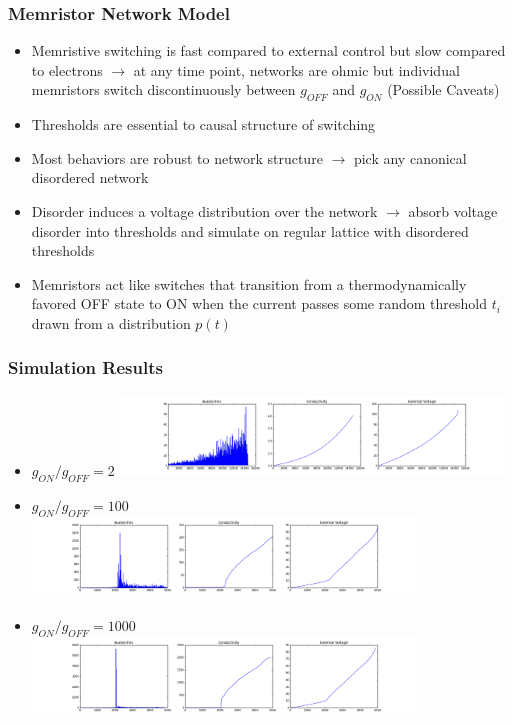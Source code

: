 \documentclass[mathserif]{beamer}
\begin{document}
\begin{frame}
\frametitle{Memristor Network Model}
\begin{itemize}
\item Memristive switching is fast compared to external control
but slow compared to electrons $\to$ at any time point, networks are
ohmic but individual memristors switch discontinuously between
$g_{OFF}$ and $g_{ON}$ (Possible Caveats)
\item Thresholds are essential to causal structure of switching
\item Most behaviors are robust to network structure $\to$ pick any canonical disordered network
\item Disorder induces a voltage distribution over the network $\to$ absorb voltage disorder into
thresholds and simulate on regular lattice with disordered thresholds
\item Memristors act like switches that transition from a thermodynamically favored OFF state
to ON when the current passes some random threshold $t_i$ drawn from a distribution $p(t)$
\end{itemize}

\end{frame}

\begin{frame}
\frametitle{Simulation Results}
\begin{itemize}
\item $g_{ON} / g_{OFF} = 2$
\includegraphics[width=0.8\textwidth]{ON2_run.png}
\item $g_{ON} / g_{OFF} = 100$
\includegraphics[width=0.8\textwidth]{ON100_run.png}
\item $g_{ON} / g_{OFF} = 1000$
\includegraphics[width=0.8\textwidth]{ON1000_run.png}
\end{itemize}
\end{frame}
\end{document}
